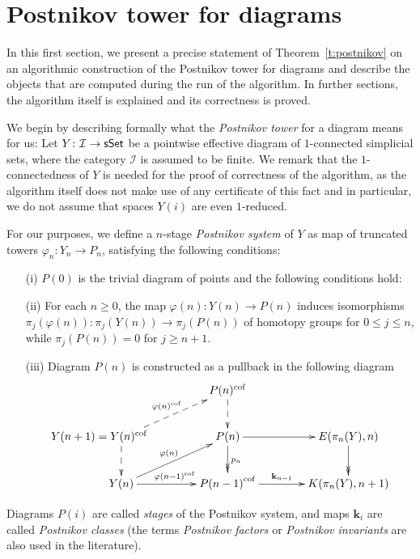 \documentclass[12pt,a4wide]{article}
\theoremstyle{plain}
\theoremstyle{definition}
\newcommand{\cofr}{\mathrm{cof}}
\newcommand{\Pst}[1]{P(#1)}
\newcommand{\Pnewst}{\Pst{\then}}
\newcommand{\Poldst}{\Pst{\then-1}}
\newcommand{\Pist}{\Pst{i}}
\newcommand{\Pzerost}{\Pst{0}}
\newcommand{\Yst}[1]{Y(#1)}
\newcommand{\Ynewst}{\Yst{\then}}
\newcommand{\Ynnewst}{\Yst{\then+1}}
\newcommand{\towercompmap}[2]{#1(#2)}
\newcommand{\varphin}{\towercompmap{\varphi}{\then}}
\newcommand{\varphinmo}{\towercompmap{\varphi}{\then-1}}
\newcommand{\then}{n}
\newcommand{\thedim}{{n}}
\renewcommand\:{\colon}
\newcommand{\dY}{Y}
\newcommand{\dpi}{\pi}
\newcommand{\dP}{P}
\newcommand{\dK}{K}
\newcommand{\dE}{E}
\newcommand{\icat}{\mathcal I}
\newcommand\kkk{{\mathbf{k}}}
\begin{document}
\section{Postnikov tower for diagrams}\label{sec:postnikov-proof}

In this first section, we present a precise statement of Theorem~\ref{t:postnikov} on an algorithmic construction of the Postnikov tower for diagrams and describe the objects that are computed during the run of the algorithm. In further sections, the algorithm itself is explained and its correctness is proved.

We begin by describing formally what the \emph{Postnikov tower} for a diagram means for us:
Let $\dY\colon \icat \to \sSet$ be a pointwise effective diagram of $1$-connected simplicial sets, where the category $\icat$ is assumed to be finite. We remark that the $1$-connectedness of $\dY$ is needed for the proof of correctness of the algorithm, as the algorithm itself does not make use of any certificate of this fact and in particular, we do not assume that spaces $\dY(i)$ are even $1$-reduced.

For our purposes, we define a $n$-stage \emph{Postnikov system} of $\dY$ as map of truncated  towers $\varphi_n\:\dY_n \to \dP_n$, satisfying the following conditions:


\begin{enumerate}
\item[(i)]  $\Pzerost$ is the trivial diagram of points and the following conditions hold:
\item[(ii)] For each $\thedim\ge 0$,
the map $\varphin: \Ynewst \to \Pnewst$
induces isomorphisms  $\dpi_j (\varphin):\dpi_j(\Ynewst)\to \dpi_j(\Pnewst)$
of homotopy groups for $0\le j\le\thedim$,
while $\dpi_j(\Pnewst)=0$ for $j\ge \thedim+1$.
\item[(iii)] Diagram $\Pnewst$ is constructed as a pullback in the following diagram
\[
\xymatrix@C=40pt{
{} & {\Pnewst^\cofr }\ar@{-->}[d]&{} \\
 \rightbox{\Ynnewst}{{}={\Ynewst^\cofr}} \ar@{-->}[ur]^{\varphin^\cofr}   \ar@{-->}[d] & \Pnewst \ar@{->>}[d]^{p_n} \ar[r] & \dE(\dpi_n (\dY), n ) \ar@{->>}[d] \\
\Ynewst \ar[r]^{\varphinmo^\cofr}  \ar[ur]^{\varphin}& {\Poldst}^\cofr\ar[r]^-{\kkk_{\thedim-1}} & \dK(\dpi_n (\dY), n+1)
} 
\]
\end{enumerate}

Diagrams  $\Pist$ are called \emph{stages}
of the Postnikov system, and
 maps $\kkk_{i}$ are called
\emph{Postnikov classes}  (the terms \emph{Postnikov factors}
or \emph{Postnikov invariants} are also used in the literature).
\end{document}
